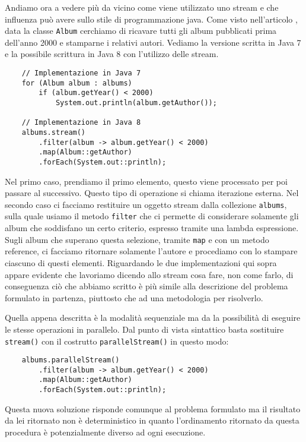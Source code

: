 		Andiamo ora a vedere più da vicino come viene utilizzato uno stream e che influenza può avere sullo stile di programmazione java. Come visto nell'articolo \cite{java-8-stream}, data la classe \lstinline|Album| cerchiamo di ricavare tutti gli album pubblicati prima dell'anno 2000 e stamparne i relativi autori. Vediamo la versione scritta in Java 7 e la possibile scrittura in Java 8 con l'utilizzo delle stream.
		\begin{lstlisting}
	// Implementazione in Java 7
	for (Album album : albums)
		if (album.getYear() < 2000)
			System.out.println(album.getAuthor());
	
	// Implementazione in Java 8
	albums.stream()
		.filter(album -> album.getYear() < 2000)
		.map(Album::getAuthor)
		.forEach(System.out::println);
		\end{lstlisting}
		Nel primo caso, prendiamo il primo elemento, questo viene processato per poi passare al successivo. Questo tipo di operazione si chiama iterazione esterna. Nel secondo caso ci facciamo restituire un oggetto stream dalla collezione \lstinline|albums|, sulla quale usiamo il metodo \lstinline|filter| che ci permette di considerare solamente gli album che soddisfano un certo criterio, espresso tramite una lambda espressione. Sugli album che superano questa selezione, tramite \lstinline|map| e con un metodo reference, ci facciamo ritornare solamente l'autore e procediamo con lo stampare ciascuno di questi elementi. Riguardando le due implementazioni qui sopra appare evidente che lavoriamo dicendo allo stream cosa fare, non come farlo, di conseguenza ciò che abbiamo scritto è più simile alla descrizione del problema formulato in partenza, piuttosto che ad una metodologia per risolverlo. 
		
		Quella appena descritta è la modalità sequenziale ma da la possibilità di eseguire le stesse operazioni in parallelo. Dal punto di vista sintattico basta sostituire \lstinline|stream()| con il costrutto \lstinline|parallelStream()| in questo modo:
		\begin{lstlisting}
	albums.parallelStream()
		.filter(album -> album.getYear() < 2000)
		.map(Album::getAuthor)
		.forEach(System.out::println);
		\end{lstlisting}
		Questa nuova soluzione risponde comunque al problema formulato ma il risultato da lei ritornato non è deterministico in quanto l'ordinamento ritornato da questa procedura è potenzialmente diverso ad ogni esecuzione.
		
